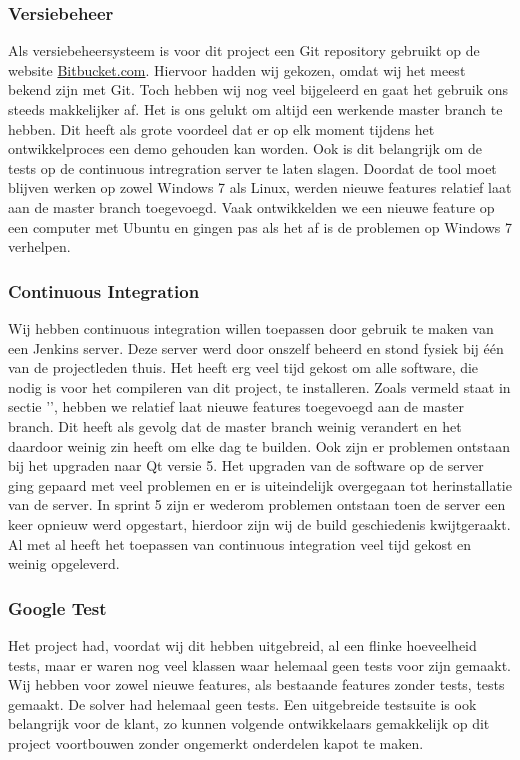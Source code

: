 \subsubsection{Versiebeheer}
\label{subsec:versiebeheer}
Als versiebeheersysteem is voor dit project een Git repository gebruikt op de website \href{http://bitbucket.com}{Bitbucket.com}. Hiervoor hadden wij gekozen, omdat wij het meest bekend zijn met Git. Toch hebben wij nog veel bijgeleerd en gaat het gebruik ons steeds makkelijker af. Het is ons gelukt om altijd een werkende master branch te hebben. Dit heeft als grote voordeel dat er op elk moment tijdens het ontwikkelproces een demo gehouden kan worden. Ook is dit belangrijk om de tests op de continuous intregration server te laten slagen. Doordat de tool moet blijven werken op zowel Windows 7 als Linux, werden nieuwe features relatief laat aan de master branch toegevoegd. Vaak ontwikkelden we een nieuwe feature op een computer met Ubuntu en gingen pas als het af is de problemen op Windows 7 verhelpen.

\subsubsection{Continuous Integration}
Wij hebben continuous integration willen toepassen door gebruik te maken van een Jenkins server. Deze server werd door onszelf beheerd en stond fysiek bij \'e\'en van de projectleden thuis. Het heeft erg veel tijd gekost om alle software, die nodig is voor het compileren van dit project, te installeren. Zoals vermeld staat in sectie '', hebben we relatief laat nieuwe features toegevoegd aan de master branch. Dit heeft als gevolg dat de master branch weinig verandert en het daardoor weinig zin heeft om elke dag te builden. Ook zijn er problemen ontstaan bij het upgraden naar Qt versie 5. Het upgraden van de software op de server ging gepaard met veel problemen en er is uiteindelijk overgegaan tot herinstallatie van de server. In sprint 5 zijn er wederom problemen ontstaan toen de server een keer opnieuw werd opgestart, hierdoor zijn wij de build geschiedenis kwijtgeraakt. Al met al heeft het toepassen van continuous integration veel tijd gekost en weinig opgeleverd. 

\subsubsection{Google Test}
Het project had, voordat wij dit hebben uitgebreid, al een flinke hoeveelheid tests, maar er waren nog veel klassen waar helemaal geen tests voor zijn gemaakt. Wij hebben voor zowel nieuwe features, als bestaande features zonder tests, tests gemaakt. De solver had helemaal geen tests. Een uitgebreide testsuite is ook belangrijk voor de klant, zo kunnen volgende ontwikkelaars gemakkelijk op dit project voortbouwen zonder ongemerkt onderdelen kapot te maken. 

